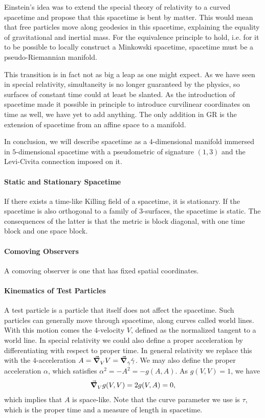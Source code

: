 Einstein's idea was to extend the special theory of relativity to a curved spacetime and propose that this spacetime is bent by matter. This would mean that free particles move along geodesics in this spacetime, explaining the equality of gravitational and inertial mass. For the equivalence principle to hold, i.e. for it to be possible to locally construct a Minkowski spacetime, spacetime must be a pseudo-Riemannian manifold.

This transition is in fact not as big a leap as one might expect. As we have seen in special relativity, simultaneity is no longer guaranteed by the physics, so surfaces of constant time could at least be slanted. As the introduction of spacetime made it possible in principle to introduce curvilinear coordinates on time as well, we have yet to add anything. The only addition in GR is the extension of spacetime from an affine space to a manifold.

In conclusion, we will describe spacetime as a $4$-dimensional manifold immersed in $5$-dimensional spacetime with a pseudometric of signature $(1, 3)$ and the Levi-Civita connection imposed on it.

\paragraph{Static and Stationary Spacetime}
If there exists a time-like Killing field of a spacetime, it is stationary. If the spacetime is also orthogonal to a family of $3$-surfaces, the spacetime is static. The consequences of the latter is that the metric is block diagonal, with one time block and one space block.

\paragraph{Comoving Observers}
A comoving observer is one that has fixed spatial coordinates.

\paragraph{Kinematics of Test Particles}
A test particle is a particle that itself does not affect the spacetime. Such particles can generally move through spacetime, along curves called world lines. With this motion comes the $4$-velocity $V$, defined as the normalized tangent to a world line. In special relativity we could also define a proper acceleration by differentiating with respect to proper time. In general relativity we replace this with the $4$-acceleration $A = \grad_{V}^{}{V} = \grad_{\dot{\gamma}}^{}{\dot{\gamma}}$.  We may also define the proper acceleration $\alpha$, which satisfies $\alpha^{2} = -A^{2} = -g(A, A)$. As $g(V, V) = 1$, we have
\begin{align*}
	\grad_{V}^{}{g(V, V)} = 2g(V, A) = 0,
\end{align*}
which implies that $A$ is space-like. Note that the curve parameter we use is $\tau$, which is the proper time and a measure of length in spacetime.

